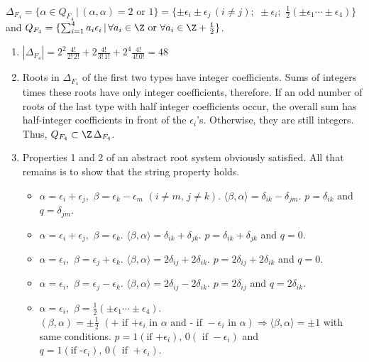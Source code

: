 \documentclass[11pt]{article}
\newenvironment{solution}[1][Solution]{\begin{trivlist}
\item[\hskip \labelsep {\bfseries #1}]}{\end{trivlist}}
\begin{document}
\begin{solution}
$\Delta_{F_4} = \{ \alpha \in Q_{F_4} \, | \, (\alpha,\alpha) = 2
\mbox{ or } 1 \} = \{ \pm \epsilon_i \pm \epsilon_j \, (i \not =
j); \,\, \pm \epsilon_i ; \,\, \frac{1}{2}(\pm \epsilon_1 \cdots
\pm \epsilon_4) \}$ and $Q_{F_4} = \{ \sum_{i=1}^{4} a_i
\epsilon_i \, | \, \forall a_i \in \Z \mbox{ or } \forall a_i \in
\Z + \frac{1}{2} \}$.

\begin{enumerate}
\item $\left| \Delta_{F_4} \right| = 2^2 \frac{4!}{2! \, 2!} +
2\frac{4!}{3! \, 1!} + 2^4 \frac{4!}{4! \, 0!} = 48$

\item Roots in $\Delta_{F_4}$ of the first two types have integer
coefficients.  Sums of integers times these roots have only
integer coefficients, therefore.  If an odd number of roots of the
last type with half integer coefficients occur, the overall sum
has half-integer coefficients in front of the $\epsilon_i$'s.
Otherwise, they are still integers.  Thus, $Q_{F_4} \subset \Z \,
\Delta_{F_4}$.

\item Properties 1 and 2 of an abstract root system obviously
satisfied. All that remains is to show that the string property
holds.
%
\begin{itemize}
\item $\alpha = \epsilon_i + \epsilon_j, \,\, \beta = \epsilon_k -
\epsilon_m \,\, (i\not = m, \, j \not = k)$.  $\langle \beta,
\alpha \rangle = \delta_{ik} - \delta_{jm}$.  $p = \delta_{ik}$
and $q = \delta_{jm}$.

\item $\alpha = \epsilon_i + \epsilon_j, \,\, \beta = \epsilon_k$.
$\langle \beta, \alpha \rangle = \delta_{ik} + \delta_{jk}$. $p =
\delta_{ik} + \delta_{jk}$ and $q = 0$.

\item $\alpha = \epsilon_i, \,\, \beta = \epsilon_j + \epsilon_k$.
$\langle \beta, \alpha \rangle = 2\delta_{ij} + 2\delta_{ik}$. $p
= 2\delta_{ij} + 2\delta_{ik}$ and $q = 0$.

\item $\alpha = \epsilon_i, \,\, \beta = \epsilon_j - \epsilon_k$.
$\langle \beta, \alpha \rangle = 2\delta_{ij} - 2\delta_{ik}$. $p
= 2\delta_{ij}$ and $q = 2\delta_{ik}$.

\item $\alpha = \epsilon_i, \,\, \beta = \frac{1}{2} ( \pm
\epsilon_1 \cdots \pm \epsilon_4 )$. $ ( \beta, \alpha ) = \pm
\frac{1}{2} \,\, ( \mbox{+ if +} \epsilon_i \mbox{ in } \alpha
\mbox{ and - if } -\epsilon_i \mbox{ in } \alpha ) \Rightarrow
\langle \beta, \alpha \rangle = \pm 1$ with same conditions. $p =
1 ( \mbox{if +}\epsilon_i), \, 0 (\mbox{ if }-\epsilon_i)$ and $q
= 1 (\mbox{if -}\epsilon_i), \, 0 (\mbox{ if }+\epsilon_i)$.


\end{itemize}
\end{enumerate}
\end{solution}
\end{document}

